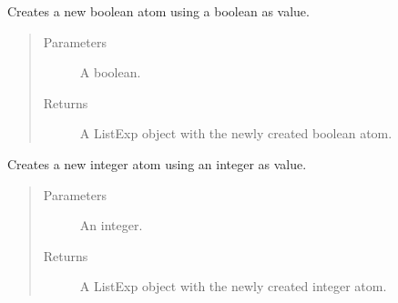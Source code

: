 \documentclass[letterpaper,10pt,english]{sphinxmanual}
\begin{document}

\begin{fulllineitems}
\label{\detokenize{index:secondodb.api.support.secondolistexpr.create_bool_atom}}
Creates a new boolean atom using a boolean as value.
\begin{quote}\begin{description}
\item[{Parameters}] \leavevmode
{} \textendash{} A boolean.

\item[{Returns}] \leavevmode
A ListExp object with the newly created boolean atom.

\end{description}\end{quote}

\end{fulllineitems}


\begin{fulllineitems}
\label{\detokenize{index:secondodb.api.support.secondolistexpr.create_integer_atom}}
Creates a new integer atom using an integer as value.
\begin{quote}\begin{description}
\item[{Parameters}] \leavevmode
{} \textendash{} An integer.

\item[{Returns}] \leavevmode
A ListExp object with the newly created integer atom.

\end{description}\end{quote}

\end{fulllineitems}

\end{document}
